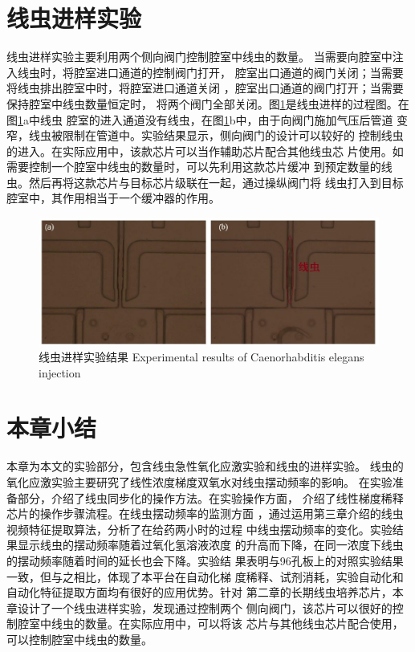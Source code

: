 \section{线虫进样实验}
线虫进样实验主要利用两个侧向阀门控制腔室中线虫的数量。
当需要向腔室中注入线虫时，将腔室进口通道的控制阀门打开，
腔室出口通道的阀门关闭；当需要将线虫排出腔室中时，将腔室进口通道关闭
，腔室出口通道的阀门打开；当需要保持腔室中线虫数量恒定时，
将两个阀门全部关闭。图\ref{fig:chap5:worms}是线虫进样的过程图。在图\ref{fig:chap5:worms}a中线虫
腔室的进入通道没有线虫，在图\ref{fig:chap5:worms}b中，由于向阀门施加气压后管道
变窄，线虫被限制在管道中。实验结果显示，侧向阀门的设计可以较好的
控制线虫的进入。在实际应用中，该款芯片可以当作辅助芯片配合其他线虫芯
片使用。如需要控制一个腔室中线虫的数量时，可以先利用这款芯片缓冲
到预定数量的线虫。然后再将这款芯片与目标芯片级联在一起，通过操纵阀门将
线虫打入到目标腔室中，其作用相当于一个缓冲器的作用。
	\begin{figure}[h]
	  \centering
	  \includegraphics[width=14cm]{figure/chap5/valve.jpg}
	  \bicaption
		{线虫进样实验结果}
		{Experimental results of Caenorhabditis elegans injection}
	  \label{fig:chap5:worms}
	\end{figure}
\section{本章小结}
	本章为本文的实验部分，包含线虫急性氧化应激实验和线虫的进样实验。
	线虫的氧化应激实验主要研究了线性浓度梯度双氧水对线虫摆动频率的影响。
	在实验准备部分，介绍了线虫同步化的操作方法。在实验操作方面，
	介绍了线性梯度稀释芯片的操作步骤流程。在线虫摆动频率的监测方面
	，通过运用第三章介绍的线虫视频特征提取算法，分析了在给药两小时的过程
	中线虫摆动频率的变化。实验结果显示线虫的摆动频率随着过氧化氢溶液浓度
	的升高而下降，在同一浓度下线虫的摆动频率随着时间的延长也会下降。实验结
	果表明与96孔板上的对照实验结果一致，但与之相比，体现了本平台在自动化梯
	度稀释、试剂消耗，实验自动化和自动化特征提取方面均有很好的应用优势。针对
	第二章的长期线虫培养芯片，本章设计了一个线虫进样实验，发现通过控制两个
	侧向阀门，该芯片可以很好的控制腔室中线虫的数量。在实际应用中，可以将该
	芯片与其他线虫芯片配合使用，可以控制腔室中线虫的数量。